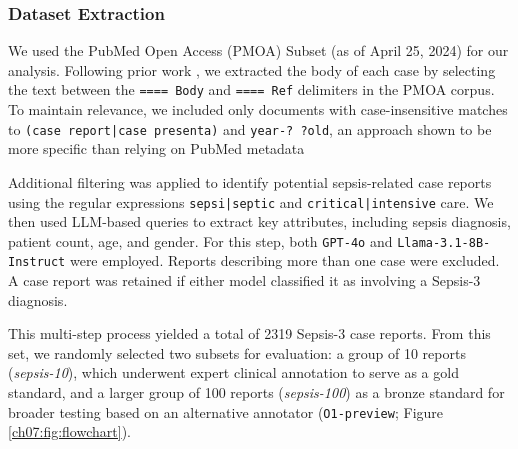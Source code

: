\subsubsection{Dataset Extraction}
We used the PubMed Open Access (PMOA) Subset (as of April 25, 2024) for our analysis.
Following prior work \cite{wang2025large}, we extracted the body of each case by selecting the text between the \texttt{==== Body} and \texttt{==== Ref} delimiters in the PMOA corpus.
To maintain relevance, we included only documents with case-insensitive matches to \texttt{(case report|case presenta)} and \texttt{year-? ?old}, an approach shown to be more specific than relying on PubMed metadata 


Additional filtering was applied to identify potential sepsis-related case reports using the regular expressions \texttt{sepsi|\allowbreak septic} and \texttt{critical|intensive} care.
We then used LLM-based queries to extract key attributes, including sepsis diagnosis, patient count, age, and gender.
For this step, both \texttt{GPT-4o} and \texttt{Llama-3.1-8B-Instruct} were employed.
Reports describing more than one case were excluded.
A case report was retained if either model classified it as involving a Sepsis-3 diagnosis.

This multi-step process yielded a total of 2319 Sepsis-3 case reports.
From this set, we randomly selected two subsets for evaluation: a group of 10 reports (\textit{sepsis-10}), which underwent expert clinical annotation to serve as a gold standard, and a larger group of 100 reports (\textit{sepsis-100}) as a bronze standard for broader testing based on an alternative annotator (\texttt{O1-preview}; Figure \ref{ch07:fig:flowchart}). %

